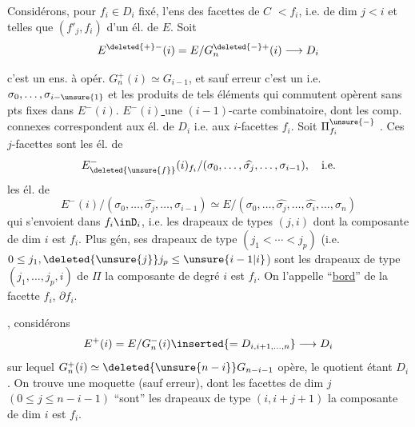 Considérons, pour $f_i\in D_i$ fixé, l'ens des facettes  de $C$  $<f_i$,  i.e. de dim $j<i$ et telles que $(f'_j,f_i)$  d'un él. de $E$. Soit 
\[
E^{\deleted{+}-}(i)=E/G_n^{\deleted{-}+}(i)\longrightarrow D_i
\]

c'est un ens. à opér. $G_n^+(i)\simeq G_{i-1}$,
et sauf erreur c'est un   i.e. $\sigma_0,\ldots,\sigma_{i-\unsure{1}}$ et les produits de tels éléments qui commutent opèrent sans pts fixes dans $E^-(i)$.
\uline{ $E^-(i)$ }   une $(i-1)$-carte combinatoire, dont les comp. connexes correspondent aux él. de $D_i$ i.e. aux $i$-facettes $f_i$.
Soit $\Pi_{f_i}^{\unsure{-}}$  . Ces $j$-facettes sont
les él. de
\[
E^-_{\deleted{\unsure{f}}}(i)_{f_i}/(\sigma_0,\ldots,\widehat{\sigma_j},\ldots,\sigma_{i-1}),\quad\text{i.e.}
\]
les él. de
\[
E^-(i)/(\sigma_0,\ldots,\widehat{\sigma_j},\ldots,\sigma_{i-1})
\simeq E/(\sigma_0,\ldots,\widehat{\sigma_j},\ldots,\widehat{\sigma_i},\ldots,\sigma_n)
\]
qui  s'envoient dans $f_i\inD_i$, i.e. les drapeaux de types $(j,i)$ dont la composante de  dim $i$ est $f_i$. Plus gén, ses drapeaux de type $(j_1<\cdots<j_p)$ (i.e. $0\leq j_1,\deleted{\unsure{j}}j_p\leq\unsure{i-1|i}$) sont les drapeaux de type $(j_1,\ldots,j_p,i)$ de $\Pi$  la composante de degré $i$ est $f_i$. On l'appelle   ``\uline{bord}'' de la facette $f_i$,  $\partial f_i$.

, considérons
\[
E^+(i)=E/G_n^-(i)\inserted{=D_{i,i+1,\ldots,n}}\longrightarrow D_i
\]
sur lequel $G_n^+(i)\simeq\deleted{\unsure{n-i}}G_{n-i-1}$ opère, le quotient étant $D_i$. On trouve une moquette  (sauf erreur), dont les facettes de dim $j$ $(0\leq j\leq n-i-1)$ ``sont'' les drapeaux de type $(i,i+j+1)$   la composante de dim $i$ est $f_i$.

